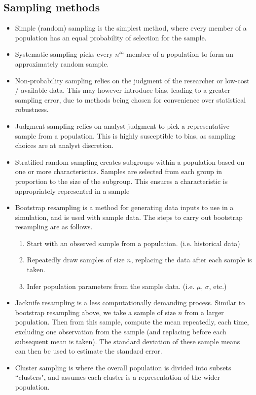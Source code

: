 \documentclass[../notes_compiled.tex]{subfiles}
\begin{document}
\subsection{Sampling methods}
\begin{itemize}
\item Simple (random) sampling is the simplest method, where every member of a population has an equal probability of selection for the sample.
\item Systematic sampling picks every $n^{th}$ member of a population to form an approximately random sample.
\item Non-probability sampling relies on the judgment of the researcher or low-cost / available data. This may however introduce bias, leading to a greater sampling error, due to methods being chosen for convenience over statistical robustness.
\item Judgment sampling relies on analyst judgment to pick a representative sample from a population. This is highly susceptible to bias, as sampling choices are at analyst discretion.
\item Stratified random sampling creates subgroups within a population based on one or more characteristics. Samples are selected from each group in proportion to the size of the subgroup. This ensures a characteristic is appropriately represented in a sample
\item Bootstrap resampling is a method for generating data inputs to use in a simulation, and is used with sample data. The steps to carry out bootstrap resampling are as follows.
\begin{enumerate}
\item Start with an observed sample from a population. (i.e. historical data)
\item Repeatedly draw samples of size $n$, replacing the data after each sample is taken.
\item Infer population parameters from the sample data. (i.e. $\mu$, $\sigma$, etc.)
\end{enumerate}
\item Jacknife resampling is a less computationally demanding process. Similar to bootstrap resampling above, we take a sample of size $n$ from a larger population. Then from this sample, compute the mean repeatedly, each time, excluding one observation from the sample (and replacing before each subsequent mean is taken). The standard deviation of these sample means can then be used to estimate the standard error.
\item Cluster sampling is where the overall population is divided into subsets ``clusters", and assumes each cluster is a representation of the wider population.

\end{itemize}
\end{document}

